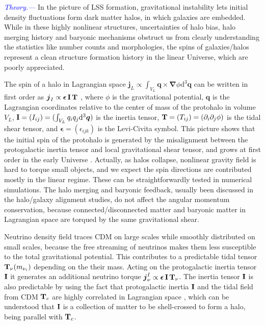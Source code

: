 \documentclass[aps,prd,twocolumn,amsmath,amssymb,amsfont,superscriptaddress]{revtex4-1}
\newcommand{\bs}{\boldsymbol}
\newcommand{\diff}{{\mathrm d}}
\newcommand{\tcb}{\textcolor{blue}}
\begin{document}
\tcb{\textit{Theory.---}}
In the picture of LSS formation, gravitational instability lets initial density fluctuations form dark matter halos, in which galaxies are embedded. While in these highly nonlinear structures, uncertainties of halo bias, halo merging history and baryonic mechanisms obstruct us from clearly understanding the statistics like number counts and morphologies, the spins of galaxies/halos represent a clean structure formation history in the linear Universe, which are poorly appreciated. 

The spin of a halo in Lagrangian space $\bs{j}_L\propto\int_{V_L}\bs{q}\times\bs{\nabla}\phi\diff^3\bs{q}$ can be written in first order as $\bs{j}_I\propto\bs{\epsilon}\,\bold{I}\,\bold{T}$ \citep{1984ApJ...286...38W}, where $\phi$ is the gravitational potential, $\bs{q}$ is the Lagrangian coordinates relative to the center of mass of the protohalo in volume $V_L$, $\bold{I}=(I_{ij})=(\int_{V_L} q_i q_j \diff^3\bs{q})$ is the inertia tensor, $\bold{T}=(T_{ij})=(\partial_i\partial_j\phi)$ is the tidal shear tensor, and $\bs{\epsilon}=(\epsilon_{ijk})$ is the Levi-Civita symbol. This picture shows that the initial spin of the protohalo is generated by the misalignment between the protogalactic inertia tensor and local gravitational shear tensor, and grows at first order in the early Universe \citep{1984ApJ...286...38W}. Actually, as halos collapse, nonlinear gravity field is hard to torque small objects, and we expect the spin directions are contributed mostly in the linear regime. These can be straightforwardly tested in numerical simulations. The halo merging and baryonic feedback, usually been discussed in the halo/galaxy alignment studies, do not affect the angular momentum conservation, because connected/disconnected matter and baryonic matter in Lagrangian space are torqued by the same gravitational shear.

Neutrino density field traces CDM on large scales while smoothly distributed on small scales, because the free streaming of neutrinos makes them less susceptible to the total gravitational potential. This contributes to a predictable tidal tensor $\bold{T}_\nu(m_{\nu_i})$ depending on the their mass. Acting on the protogalactic inertia tensor $\bold{I}$ it generates an additional neutrino torque $\bs{j}^I_\nu\propto\bs{\epsilon}\,\bold{I}\,\bold{T}_\nu$. The inertia tensor $\bold{I}$ is also predictable by using the fact that protogalactic inertia $\bold{I}$ and the tidal field from CDM $\bold{T}_c$ are highly correlated in Lagrangian space \citep{2000ApJ...532L...5L,2001ApJ...555..106L}, which can be understood that $\bold{I}$ is a collection of matter to be shell-crossed to form a halo, being parallel with $\bold{T}_c$.
\end{document}
